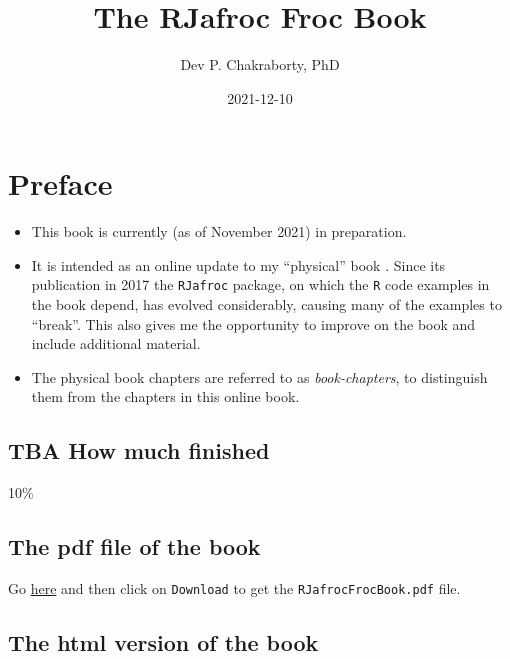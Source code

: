 \documentclass[
]{book}
\title{The RJafroc Froc Book}
\author{Dev P. Chakraborty, PhD}
\date{2021-12-10}
\providecommand{\tightlist}{%
  \setlength{\itemsep}{0pt}\setlength{\parskip}{0pt}}
\begin{document}
\maketitle

{
\setcounter{tocdepth}{1}
\tableofcontents
}
\hypertarget{preface}{%
\chapter*{Preface}\label{preface}}

\begin{itemize}
\tightlist
\item
  This book is currently (as of November 2021) in preparation.
\item
  It is intended as an online update to my ``physical'' book \citep{chakraborty2017observer}. Since its publication in 2017 the \texttt{RJafroc} package, on which the \texttt{R} code examples in the book depend, has evolved considerably, causing many of the examples to ``break''. This also gives me the opportunity to improve on the book and include additional material.
\item
  The physical book chapters are referred to as \emph{book-chapters}, to distinguish them from the chapters in this online book.
\end{itemize}

\hypertarget{tba-how-much-finished}{%
\section*{TBA How much finished}\label{tba-how-much-finished}}

10\%

\hypertarget{the-pdf-file-of-the-book}{%
\section*{The pdf file of the book}\label{the-pdf-file-of-the-book}}

Go \href{https://github.com/dpc10ster/RJafrocFrocBook/blob/gh-pages/RJafrocFrocBook.pdf}{here} and then click on \texttt{Download} to get the \texttt{RJafrocFrocBook.pdf} file.

\hypertarget{the-html-version-of-the-book}{%
\section*{The html version of the book}\label{the-html-version-of-the-book}}
\end{document}
